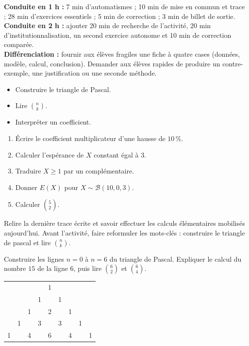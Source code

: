 \ifprof
\begin{methode}
\textbf{Conduite en 1 h :} 7 min d'automatismes ; 10 min de mise en commun et trace ; 28 min d'exercices essentiels ; 5 min de correction ; 3 min de billet de sortie.\\
\textbf{Conduite en 2 h :} ajouter 20 min de recherche de l'activité, 20 min d'institutionnalisation, un second exercice autonome et 10 min de correction comparée.\\
\textbf{Différenciation :} fournir aux élèves fragiles une fiche à quatre cases (données, modèle, calcul, conclusion). Demander aux élèves rapides de produire un contre-exemple, une justification ou une seconde méthode.
\end{methode}
\fi
{}
\begin{objectifs}\begin{itemize}\item Construire le triangle de Pascal.\item Lire $\binom nk$.\item Interpréter un coefficient.\end{itemize}\end{objectifs}
\begin{automatismes}\begin{enumerate}\item Écrire le coefficient multiplicateur d'une hausse de $10\,\%$. \item Calculer l'espérance de $X$ constant égal à $3$. \item Traduire $X\geq1$ par un complémentaire. \item Donner $E(X)$ pour $X\sim\mathcal B(10,0{,}3)$. \item Calculer $\binom52$. \end{enumerate}\end{automatismes}
\begin{prerequis}Relire la dernière trace écrite et savoir effectuer les calculs élémentaires mobilisés aujourd'hui. Avant l'activité, faire reformuler les mots-clés : construire le triangle de pascal et lire $\binom nk$.\end{prerequis}

\begin{activite}
Construire les lignes $n=0$ à $n=6$ du triangle de Pascal. Expliquer le calcul du nombre $15$ de la ligne $6$, puis lire $\binom62$ et $\binom64$.
\begin{center}\begin{tabular}{*{9}{c}}&&&&1&&&&\\&&&1&&1&&&\\&&1&&2&&1&&\\&1&&3&&3&&1&\\1&&4&&6&&4&&1\end{tabular}\end{center}
\end{activite}

